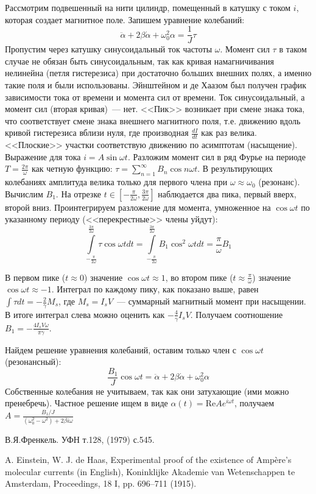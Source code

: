 \documentclass[a4paper]{article}
\begin{document}
Рассмотрим подвешенный на нити цилиндр, помещенный в катушку с током $i$, которая создает магнитное поле. Запишем уравнение колебаний:
$$\ddot{\alpha}+2\beta\dot{\alpha}+\omega_0^2\alpha=\frac{1}{J}\tau$$
Пропустим через катушку синусоидальный ток частоты $\omega$. Момент сил $\tau$ в таком случае не обязан быть синусоидальным, так как кривая намагничивания нелинейна (петля гистерезиса) при достаточно больших внешних полях, а именно такие поля и были использованы. Эйнштейном и де Хаазом был получен график зависимости тока от времени и момента сил от времени. Ток синусоидальный, а момент сил (вторая кривая)~--- нет.\newline
<<Пик>> возникает при смене знака тока, что соответствует смене знака внешнего магнитного поля, т.е. движению вдоль кривой гистерезиса вблизи нуля, где производная $\frac{dI}{dt}$ как раз велика. <<Плоские>> участки соответствую движению по асимптотам (насыщение).
Выражение для тока $i=A\sin\omega t$. Разложим момент сил в ряд Фурье на периоде $T=\frac{2\pi}{\omega}$ как четную функцию: $\tau=\sum\limits_{n=1}^{\infty}B_n\cos n\omega t$. В результирующих колебаниях амплитуда велика только для первого члена при $\omega\approx\omega_0$ (резонанс). Вычислим $B_1$. На отрезке $t\in[-\frac{\pi}{2\omega},\frac{3\pi}{2\omega}]$ наблюдается два пика, первый вверх, второй вниз. Проинтегрируем разложение для момента, умноженное на $\cos\omega t$ по указанному периоду (<<перекрестные>> члены уйдут): $$\int\limits_{-\frac{\pi}{2\omega}}^{\frac{3\pi}{2\omega}}\tau\cos\omega tdt=\int\limits_{-\frac{\pi}{2\omega}}^{\frac{3\pi}{2\omega}}B_1\cos^2\omega tdt=\frac{\pi}{\omega}B_1$$

В первом пике ($t\approx0$) значение $\cos\omega t\approx 1$, во втором пике ($t\approx \frac{\pi}{\omega}$) значение $\cos\omega t\approx -1$. Интеграл по каждому пику, как показано выше, равен $\int \tau dt=-\frac{2}{\gamma}M_s$, где $M_s=I_sV$~--- суммарный магнитный момент при насыщении. В итоге интеграл слева можно оценить как $-\frac{4}{\gamma}I_sV$. Получаем соотношение $B_1=-\frac{4I_sV\omega}{\pi\gamma}$.

Найдем решение уравнения колебаний, оставим только член с $\cos\omega t$ (резонансный):
$$
\frac{B_1}{J}\cos\omega t=\ddot{\alpha}+2\beta\dot{\alpha}+\omega_0^2\alpha
$$
Собственные колебания не учитываем, так как они затухающие (ими можно пренебречь). Частное решение ищем в виде $\alpha(t)=\mbox{Re} Ae^{i\omega t}$, получаем $A=\frac{B_1/J}{(\omega_0^2-\omega^2)+2\beta i\omega}$
\begin{thebibliography}{}
\item В.Я.Френкель. УФН т.128, (1979) с.545.
\item A. Einstein, W. J. de Haas, Experimental proof of the existence of Ampère's molecular currents (in English), Koninklijke Akademie van Wetenschappen te Amsterdam, Proceedings, 18 I, pp. 696–711 (1915).
\end{thebibliography}
\end{document}
